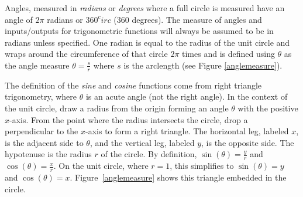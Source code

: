         Angles, measured in \textit{radians} or \textit{degrees} where a full circle is measured have an angle of $2\pi$ radians or $360^circ$ ($360$ degrees). The measure of angles and inputs/outputs for trigonometric functions will always be assumed to be in radians unless specified. One radian is equal to the radius of the unit circle and wraps around the circumference of that circle $2\pi$ times and is defined using $\theta$ as the angle measure $\theta = \frac{s}{r}$ where $s$ is the arclength (see Figure \ref{anglemeasure}).

        The definition of the \textit{sine} and \textit{cosine} functions come from right triangle trigonometry, where $\theta$ is an acute angle (not the right angle). In the context of the unit circle, draw a radius from the origin forming an angle $\theta$ with the positive $x$-axis. From the point where the radius intersects the circle, drop a perpendicular to the $x$-axis to form a right triangle. The horizontal leg, labeled $x$, is the adjacent side to $\theta$, and the vertical leg, labeled $y$, is the opposite side. The hypotenuse is the radius $r$ of the circle. By definition, $\sin(\theta) = \frac{y}{r}$ and $\cos(\theta) = \frac{x}{r}$. On the unit circle, where $r = 1$, this simplifies to $\sin(\theta) = y$ and $\cos(\theta) = x$. Figure~\ref{anglemeasure} shows this triangle embedded in the circle.

